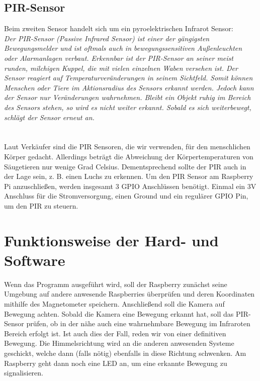 \documentclass[9pt,a4paper]{IEEEtran}
\begin{document}
\subsection{PIR-Sensor}
Beim zweiten Sensor handelt sich um ein pyroelektrischen Infrarot Sensor:\\
\textit{Der PIR-Sensor (Passive Infrared Sensor) ist einer der gängigsten Bewegungsmelder und ist oftmals auch in bewegungssensitiven Außenleuchten oder Alarmanlagen verbaut.
Erkennbar ist der PIR-Sensor an seiner meist runden, milchigen Kuppel, die mit vielen einzelnen Waben versehen ist. 
Der Sensor reagiert auf Temperaturveränderungen in seinem Sichtfeld. 
Somit können Menschen oder Tiere im Aktionsradius des Sensors erkannt werden. 
Jedoch kann der Sensor nur Veränderungen wahrnehmen. 
Bleibt ein Objekt ruhig im Bereich des Sensors stehen, so wird es nicht weiter erkannt. 
Sobald es sich weiterbewegt, schlägt der Sensor erneut an.}\cite[S. 493]{Raspi}\\ \\
\\
Laut Verkäufer sind die PIR Sensoren, die wir verwenden, für den menschlichen Körper gedacht. 
Allerdings beträgt die Abweichung der Körpertemperaturen von Säugetieren nur wenige Grad Celsius.
Dementsprechend sollte der PIR auch in der Lage sein, z. B. einen Luchs zu erkennen.
Um den PIR Sensor am Raspberry Pi anzuschließen, werden insgesamt 3 GPIO Anschlüssen benötigt.
Einmal ein 3V Anschluss für die Stromversorgung, einen Ground und ein regulärer GPIO Pin, um den PIR zu steuern.

\section{Funktionsweise der Hard- und Software}
Wenn das Programm ausgeführt wird, soll der Raspberry zunächst seine Umgebung auf andere anwesende Raspberries überprüfen und deren Koordinaten mithilfe des Magnetometer speichern. 
Anschließend soll die Kamera auf Bewegung achten. 
Sobald die Kamera eine Bewegung erkannt hat, soll das PIR-Sensor prüfen, ob in der nähe auch eine wahrnehmbare Bewegung im Infraroten Bereich erfolgt ist. 
Ist auch dies der Fall, reden wir von einer definitiven Bewegung. 
Die Himmelsrichtung wird an die anderen anwesenden Systeme geschickt, welche dann (falls nötig) ebenfalls in diese Richtung schwenken. 
Am Raspberry geht dann noch eine LED an, um eine erkannte Bewegung zu signalisieren. 
\end{document}
